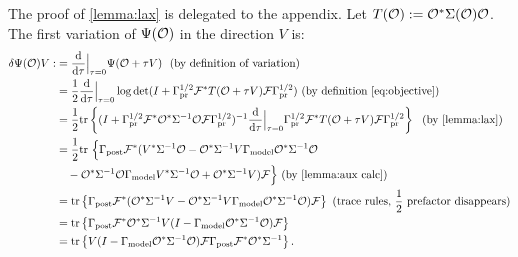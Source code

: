 \documentclass{amsart}
\numberwithin{equation}{section}
\begin{document}
The proof of \ref{lemma:lax} is delegated to the appendix. Let
$T(\mathcal{O}) := \mathcal{O}^*\Sigma(\mathcal{O})\mathcal{O}$. The first variation of $\Psi
(\mathcal{O})$ in the direction $V$ is:
\begin{align}\label{eq:tar var}
  \begin{split}
    \delta \Psi(\mathcal{O}) V 
    :&= \frac{\text{\textup{d}}}{\text{\textup{d}}\tau} \Big |_{\tau=0} \Psi(\mathcal{O} + \tau V)\  \text{ (by definition of variation)}\\
    &= \frac12 \frac{\text{\textup{d}}}{\text{\textup{d}} \tau} \Big |_{\tau=0} \log \det 
    (I + \Gamma_{\textup{pr}}^{1/2} \mathcal{F}^* T(\mathcal{O}+\tau V)\mathcal{F} \Gamma_{\textup{pr}}^{1/2} ) \text{ (by definition \eqref{eq:objective})}\\
    &= \frac12 \textup{tr}\left \{( I + \Gamma_{\textup{pr}}^{1/2} \mathcal{F}^* \mathcal{O}^* \Sigma^{-1}
    \mathcal{O}\mathcal{F} \Gamma_{\textup{pr}}^{1/2} )^{-1}
    \frac{\text{\textup{d}}}{\text{\textup{d}} \tau} \Big |_{\tau=0}
    \Gamma_{\textup{pr}}^{1/2} \mathcal{F}^* T(\mathcal{O}+\tau V) \mathcal{F} \Gamma_{\textup{pr}}^{1/2} \right \}\ \text{ (by \ref{lemma:lax})}\\
    &= \frac12 \textup{tr}\ \Big \{ \Gamma_{\textup{post}} \mathcal{F}^* (V^* \Sigma^{-1} \mathcal{O} 
      - \mathcal{O}^*\Sigma^{-1} V\Gamma_{\textup{model}} \mathcal{O}^* \Sigma^{-1}\mathcal{O} \\
      &\ \ \ - \mathcal{O}^* \Sigma^{-1} \mathcal{O} \Gamma_{\textup{model}} V^* \Sigma^{-1}\mathcal{O} 
      + \mathcal{O}^* \Sigma^{-1} V ) \mathcal{F} \Big \}  \text{ (by \ref{lemma:aux calc})}\\
    &= \textup{tr}\left \{\Gamma_{\textup{post}} \mathcal{F}^* ( \mathcal{O}^* \Sigma^{-1} V 
    - \mathcal{O}^*\Sigma^{-1} V\Gamma_{\textup{model}} \mathcal{O}^* \Sigma^{-1}\mathcal{O} ) \mathcal{F} \right \} \text{ (trace rules, $\frac{1}{2}$ prefactor disappears)} \\
    &= \textup{tr}\left \{\Gamma_{\textup{post}} \mathcal{F}^* \mathcal{O}^* \Sigma^{-1} V 
    ( I - \Gamma_{\textup{model}} \mathcal{O}^* \Sigma^{-1}\mathcal{O} ) \mathcal{F} \right \} \\
    &= \textup{tr}\left \{V ( I - \Gamma_{\textup{model}} \mathcal{O}^* \Sigma^{-1}\mathcal{O} )
    \mathcal{F} \Gamma_{\textup{post}} \mathcal{F}^* \mathcal{O}^* \Sigma^{-1} \right \}.
  \end{split}
\end{align} 
\end{document}
